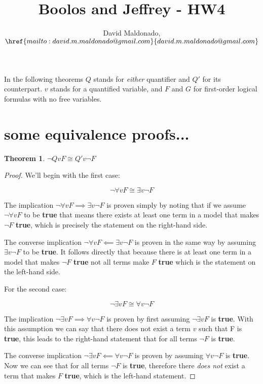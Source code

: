 \documentclass[a4paper,11pt]{article}
\author{David Maldonado, $\href{mailto:david.m.maldonado@gmail.com}%
{david.m.maldonado@gmail.com}$}
\title{Boolos and Jeffrey - HW4}
\newtheorem{thm}{Theorem}[section]
\begin{document}
\maketitle

\bigskip


In the following theorems $Q$ stands for \textit{either} quantifier and $Q'$ for its counterpart. $v$ stands for 
a quantified variable, and $F$ and $G$ for first-order logical formulas with no free variables.


\section{some equivalence proofs...}

\begin{thm}$\lnot Qv F \cong Q'v \lnot F $\end{thm}
	
	\begin{proof}
		We'll begin with the first case: 
		
		\begin{equation} \lnot \forall v F \cong \exists v \lnot F \end{equation}
		
		The implication $\lnot \forall v F \implies \exists v \lnot F$ is proven simply by noting that if we assume 
		$\lnot \forall v F$ to be \textbf{true} that means there exists at least one term in a model that makes 
		$\lnot F$ \textbf{true}, which is precisely the statement on the right-hand side.
		
		The converse implication $\lnot \forall v F \impliedby \exists v \lnot F$ is proven in the same way by
		assuming $\exists v \lnot F$ to be \textbf{true}. It follows directly that because there is at least one term
		in a model that makes $\lnot F$ \textbf{true} not all terms make $F$ \textbf{true} which is the statement 			on the left-hand side.
		
		\bigskip
		
		For the second case:
		
		\begin{equation} \lnot \exists v F \cong \forall v \lnot F \end{equation}
		
		The implication $\lnot \exists v F \implies \forall v \lnot F$ is proven by first assuming $\lnot \exists v F$ 
		is \textbf{true}. With this assumption we can say that there does not exist a term $v$ such that F is 
		\textbf{true}, this leads to the right-hand statement that for all terms $\lnot F$ is \textbf{true}.
		
		The converse implication $\lnot \exists v F \impliedby \forall v \lnot F$ is proven by assuming 
		$\forall v \lnot F$ is \textbf{true}. Now we can see that for all terms $\lnot F$ is \textbf{true}, therefore
		there \textit{does not} exist a term that makes $F$ \textbf{true}, which is the left-hand statement.
	\end{proof}
	
\end{document}
